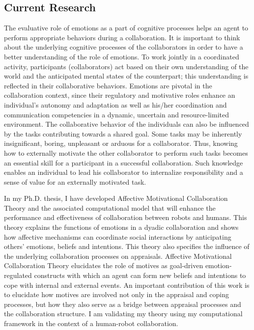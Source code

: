 \documentclass[a4paper, 11pt]{article}
\begin{document}
\begin{small}
\vspace*{-5mm}
\section*{Current Research}

The evaluative role of emotions as a part of cognitive processes helps an agent
to perform appropriate behaviors during a collaboration. It is important to
think about the underlying cognitive processes of the collaborators in order to
have a better understanding of the role of emotions. To work jointly in a
coordinated activity, participants (collaborators) act based on their own
understanding of the world and the anticipated mental states of the counterpart;
this understanding is reflected in their collaborative behaviors. Emotions are
pivotal in the collaboration context, since their regulatory and motivative
roles enhance an individual's autonomy and adaptation as well as his/her
coordination and communication competencies in a dynamic, uncertain and
resource-limited environment. The collaborative behavior of the individuals can
also be influenced by the tasks contributing towards a shared goal. Some tasks
may be inherently insignificant, boring, unpleasant or arduous for a
collaborator. Thus, knowing how to externally motivate the other collaborator to
perform such tasks becomes an essential skill for a participant in a successful
collaboration. Such knowledge enables an individual to lead his collaborator to
internalize responsibility and a sense of value for an externally motivated
task.

In my Ph.D. thesis, I have developed Affective Motivational Collaboration Theory
and the associated computational model that will enhance the performance and
effectiveness of collaboration between robots and humans. This theory explains
the functions of emotions in a dyadic collaboration and shows how affective
mechanisms can coordinate social interactions by anticipating others' emotions,
beliefs and intentions. This theory also specifies the influence of the
underlying collaboration processes on appraisals. Affective Motivational
Collaboration Theory elucidates the role of motives as goal-driven
emotion-regulated constructs with which an agent can form new beliefs and
intentions to cope with internal and external events. An important contribution
of this work is to elucidate how motives are involved not only in the appraisal
and coping processes, but how they also serve as a bridge between appraisal
processes and the collaboration structure. I am validating my theory using my
computational framework in the context of a human-robot collaboration.


\end{small}
\end{document}
